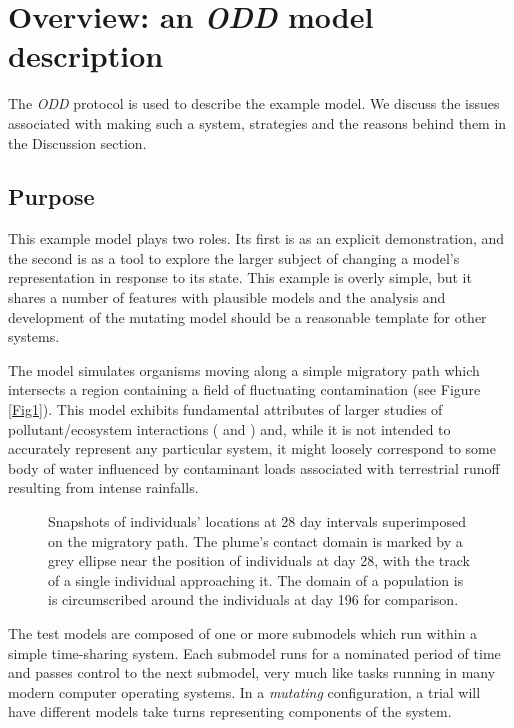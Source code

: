 \section{Overview: an {\em{ODD}\/} model description}\label{ODD}

The {\em{ODD}\/} protocol \citep{Grimm06:1} is used to describe the example
model. We discuss the issues associated with making such a system, strategies
and the reasons behind them in the Discussion section.

\subsection{Purpose}

This example model plays two roles. Its first is as an explicit demonstration,
and the second is as a tool to explore the larger subject of changing a
model's representation in response to its state. This example is overly
simple, but it shares a number of features with plausible models and the
analysis and development of the mutating model should be a reasonable template
for other systems.

The model simulates organisms moving along a simple migratory path which
intersects a region containing a field of fluctuating contamination (see
Figure \ref{Fig1}). This model exhibits fundamental attributes of larger
studies of pollutant/ecosystem interactions (\citeauthor{Lyne94:1} and
\citeauthor{Gray06:1}) and, while it is not intended to accurately represent any
particular system, it might loosely correspond to some body of water
influenced by contaminant loads associated with terrestrial runoff resulting
from intense rainfalls.

\begin{figure}[h]
  
  \caption{Snapshots of individuals' locations at 28 day intervals
  superimposed on the migratory path. The plume's contact domain is marked by
  a grey ellipse near the position of individuals at day 28, with the track of
  a single individual approaching it. The domain of a population is is
  circumscribed around the individuals at day 196 for comparison.}
\end{figure}\label{Fig1}



The test models are composed of one or more submodels which run within a
simple time-sharing system. Each submodel runs for a nominated period of time
and passes control to the next submodel, very much like tasks running in many
modern computer operating systems. In a {\em{mutating}\/} configuration, a
trial will have different models take turns representing components of the
system.

